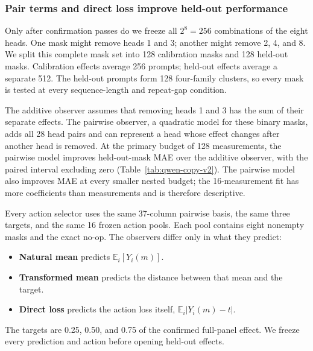 \subsubsection{Pair terms and direct loss improve held-out performance}

Only after confirmation passes do we freeze all $2^8=256$ combinations of the
eight heads. One mask might remove heads 1 and 3; another might remove 2, 4,
and 8. We split this complete mask set into 128 calibration masks and 128
held-out masks. Calibration effects average 256 prompts; held-out effects
average a separate 512. The held-out prompts form 128 four-family clusters, so
every mask is tested at every sequence-length and repeat-gap condition.

The additive observer assumes that removing heads 1 and 3 has the sum of their
separate effects. The pairwise observer, a quadratic model for these binary
masks, adds all 28 head pairs and can represent a head whose effect changes
after another head is removed. At the primary budget of 128 measurements, the
pairwise model improves held-out-mask MAE over the additive observer, with the
paired interval excluding zero (Table~\ref{tab:qwen-copy-v2}). The pairwise
model also improves MAE at every smaller nested budget; the 16-measurement fit
has more coefficients than measurements and is therefore descriptive.

Every action selector uses the same 37-column pairwise basis, the same three
targets, and the same 16 frozen action pools. Each pool contains eight nonempty
masks and the exact no-op. The observers differ only in
what they predict:

\begin{itemize}
  \item \textbf{Natural mean} predicts $\mathbb E_i[Y_i(m)]$.
  \item \textbf{Transformed mean} predicts the distance between that mean and
  the target.
  \item \textbf{Direct loss} predicts the action loss itself,
  $\mathbb E_i|Y_i(m)-t|$.
\end{itemize}

The targets are 0.25, 0.50, and 0.75 of the confirmed full-panel effect. We
freeze every prediction and action before opening held-out effects.

